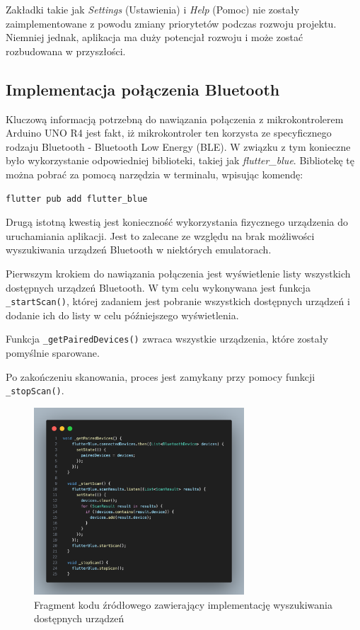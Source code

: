 \documentclass{report}
\begin{document}
Zakładki takie jak \textit{Settings} (Ustawienia) i \textit{Help} (Pomoc) nie zostały zaimplementowane z powodu zmiany priorytetów podczas rozwoju projektu. Niemniej jednak, aplikacja ma duży potencjał rozwoju i może zostać rozbudowana w przyszłości.

\subsection{\Large Implementacja połączenia Bluetooth}
%
%

Kluczową informacją potrzebną do nawiązania połączenia z mikrokontrolerem Arduino UNO R4 jest fakt, iż mikrokontroler ten korzysta ze specyficznego rodzaju Bluetooth - Bluetooth Low Energy (BLE). W związku z tym konieczne było wykorzystanie odpowiedniej biblioteki, takiej jak \textit{flutter\_blue}. Bibliotekę tę można pobrać za pomocą narzędzia w terminalu, wpisując komendę:
\begin{verbatim}
flutter pub add flutter_blue
\end{verbatim}
Drugą istotną kwestią jest konieczność wykorzystania fizycznego urządzenia do uruchamiania aplikacji. Jest to zalecane ze względu na brak możliwości wyszukiwania urządzeń Bluetooth w niektórych emulatorach.


Pierwszym krokiem do nawiązania połączenia jest wyświetlenie listy wszystkich dostępnych urządzeń Bluetooth. W tym celu wykonywana jest funkcja \texttt{\_startScan()}, której zadaniem jest pobranie wszystkich dostępnych urządzeń i dodanie ich do listy w celu późniejszego wyświetlenia.

Funkcja \texttt{\_getPairedDevices()} zwraca wszystkie urządzenia, które zostały pomyślnie sparowane.

Po zakończeniu skanowania, proces jest zamykany przy pomocy funkcji \texttt{\_stopScan()}.

\begin{figure}[H]
    \centering
    \includegraphics[width=0.7\textwidth]{src/app/_getPairedDeviced.png}
    \caption{Fragment kodu źródłowego zawierający implementację wyszukiwania dostępnych urządzeń}
    \label{fig:con-list}
\end{figure}
\end{document}

